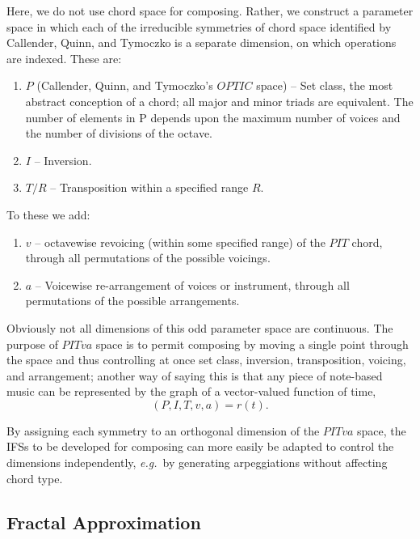 \documentclass[english,11pt,letterpaper,onecolumn]{scrartcl}
\numberwithin{equation}{section}
\begin{document}
    Here, we do not use chord space for composing. Rather, we construct a 
parameter 
    space in which each of the irreducible symmetries of chord space identified 
by 
    Callender, Quinn, and Tymoczko is a separate dimension, on which operations 
are 
    indexed. These are:
    
    \begin{enumerate}
        \item $P$ (Callender, Quinn, and Tymoczko's $OPTIC$ space) -- Set 
class, the 
        most abstract conception of a chord; all major and minor triads are 
equivalent. 
        The number of elements in P depends upon the maximum number of voices 
and the 
        number of divisions of the octave.
        \item $I$ -- Inversion.
        \item $T/R$ -- Transposition within a specified range $R$.
    \end{enumerate}
    
    \noindent To these we add:
    
    \begin{enumerate}[resume]
        \item $v$ -- octavewise revoicing (within some specified range) of the 
        $PIT$ chord, through all permutations of the possible voicings.
        \item $a$ -- Voicewise re-arrangement of voices or instrument, through 
all
        permutations of the possible arrangements.
    \end{enumerate}
    
    \noindent Obviously not all dimensions of this odd parameter space are 
    continuous. The purpose of $PITva$ space is to permit composing by moving 
a 
    single point through the space and thus controlling at once set class, 
    inversion, transposition, voicing, and arrangement; another way of saying 
this 
    is that any piece of note-based music can be represented by the 
    graph of a vector-valued function of time, $$(P, I, T, v, a) = 
    r(t).$$
    
    By assigning each symmetry to an orthogonal dimension of the $PITva$ space, 
the 
    IFSs to be developed for composing can more easily be adapted to control 
the 
    dimensions independently, \textit{e.g.}\ by generating arpeggiations 
without 
    affecting chord type.
    
 \subsection{Fractal Approximation}
\end{document}

